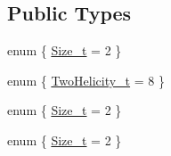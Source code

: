 \subsection*{Public Types}
\begin{DoxyCompactItemize}
\item 
enum \{ \mbox{\hyperlink{structHadron_1_1H4D3E2Rep_ac6ad666ec628fe523518216973e54a7aaa707baa0e7f94e6e88673d8a162465ed}{Size\+\_\+t}} = 2
 \}
\item 
enum \{ \mbox{\hyperlink{structHadron_1_1H4D3E2Rep_a2fe6ce8aeaf70a9ea0bb0f78e1f6c6d6ac02274bc942a9efb70a7af8ed4e742f2}{Two\+Helicity\+\_\+t}} = 8
 \}
\item 
enum \{ \mbox{\hyperlink{structHadron_1_1H4D3E2Rep_ac6ad666ec628fe523518216973e54a7aaa707baa0e7f94e6e88673d8a162465ed}{Size\+\_\+t}} = 2
 \}
\item 
enum \{ \mbox{\hyperlink{structHadron_1_1H4D3E2Rep_ac6ad666ec628fe523518216973e54a7aaa707baa0e7f94e6e88673d8a162465ed}{Size\+\_\+t}} = 2
 \}
\end{DoxyCompactItemize}
